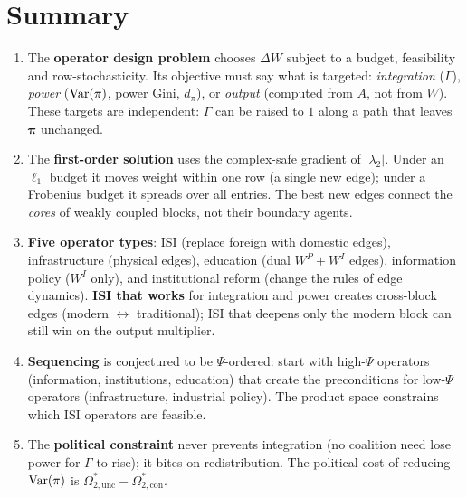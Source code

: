 \documentclass[../structural_economics_book.tex]{subfiles}
\begin{document}
\section{Summary}
\label{ch15:sec:summary}

\begin{enumerate}
\item The \textbf{operator design problem} chooses $\Delta W$ subject to a budget, feasibility and row-stochasticity. Its objective must say what is targeted: \emph{integration} ($\Gamma$), \emph{power} ($\operatorname{Var}(\pi)$, power Gini, $d_\pi$), or \emph{output} (computed from $A$, not from $W$). These targets are independent: $\Gamma$ can be raised to $1$ along a path that leaves $\boldsymbol{\pi}$ unchanged.

\item The \textbf{first-order solution} uses the complex-safe gradient of $|\lambda_2|$. Under an $\ell_1$ budget it moves weight within one row (a single new edge); under a Frobenius budget it spreads over all entries. The best new edges connect the \emph{cores} of weakly coupled blocks, not their boundary agents.

\item \textbf{Five operator types}: ISI (replace foreign with domestic edges), infrastructure (physical edges), education (dual $W^P + W^I$ edges), information policy ($W^I$ only), and institutional reform (change the rules of edge dynamics). \textbf{ISI that works} for integration and power creates cross-block edges (modern $\leftrightarrow$ traditional); ISI that deepens only the modern block can still win on the output multiplier.

\item \textbf{Sequencing} is conjectured to be $\Psi$-ordered: start with high-$\Psi$ operators (information, institutions, education) that create the preconditions for low-$\Psi$ operators (infrastructure, industrial policy). The product space constrains which ISI operators are feasible.

\item The \textbf{political constraint} never prevents integration (no coalition need lose power for $\Gamma$ to rise); it bites on redistribution. The political cost of reducing $\operatorname{Var}(\pi)$ is $\Omega^*_{2,\text{unc}} - \Omega^*_{2,\text{con}}$.
\end{enumerate}
\end{document}
